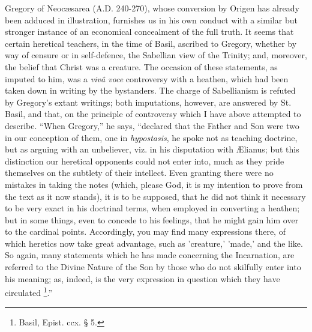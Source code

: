 Gregory of Neocæsarea (A.D. 240-270), whose
conversion by Origen has already been adduced in illustration,
furnishes us in his own conduct with a similar but stronger instance
of an economical concealment of the full truth. It seems that certain
heretical teachers, in the time of Basil, ascribed to Gregory, whether
by way of censure or in self-defence, the Sabellian view of the
Trinity; and, moreover, the belief that Christ was a creature. The
occasion of these statements, as imputed to him, was a \emph{vivâ voce}
controversy with a heathen, which had been taken down in writing by
the bystanders. The charge of Sabellianism is refuted by Gregory's
extant writings; both imputations, however, are answered by St. Basil,
and that, on the principle of controversy which I have above
attempted to describe. ``When Gregory,'' he says,
``declared that the Father and Son were two in our conception of
them, one in \emph{hypostasis}, he spoke not as teaching doctrine, but
as arguing with an unbeliever, viz. in his disputation with Ælianus;
but this distinction our heretical opponents could not enter into,
much as they pride themselves on the subtlety of their intellect. Even
granting there were no mistakes in taking the notes (which, please
God, it is my intention to prove from the text as it now stands), it
is to be supposed, that he did not think it necessary to be very exact
in his doctrinal terms, when employed in converting a heathen; but in
some things, even to concede to his feelings, that he might gain him
over to the cardinal points. Accordingly, you may find many
expressions there, of which heretics now take great advantage, such as
'creature,' 'made,' and the like. So again, many statements which he
has made concerning the Incarnation, are referred to the Divine Nature
of the Son by those who do not skilfully enter into his meaning; as,
indeed, is the very expression in question which they have circulated
\footnote{Basil, Epist. ccx. § 5.}.''

